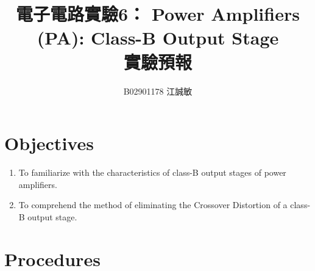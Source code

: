 \documentclass[12pt, a4paper]{article}
\title{ \bf {\huge 電子電路實驗6： Power Amplifiers (PA): Class-B Output Stage }\\ 實驗預報}
\author{B02901178 江誠敏}
\begin{document}
\maketitle

\section{Objectives}
\begin{enumerate}
  \item To familiarize with the characteristics of class-B output stages of power amplifiers. 
  \item To comprehend the method of eliminating the Crossover Distortion of a class-B output stage. 
\end{enumerate}


\section{Procedures}
\end{document}
